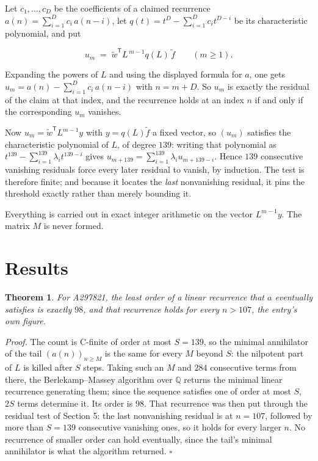 \documentclass[11pt]{article}
\newtheorem{theorem}{Theorem}
\theoremstyle{definition}
\begin{document}
Let $c_1,\dots,c_D$ be the coefficients of a claimed recurrence $a(n) = \sum_{i=1}^{D} c_i\,a(n-i)$, let $q(t) = t^{D} - \sum_{i=1}^{D} c_i t^{D-i}$ be its characteristic polynomial, and put

\[u_m \;=\; \tilde w^{\mathsf T} L^{\,m-1} q(L)\,\tilde f \qquad (m \ge 1).\]

Expanding the powers of $L$ and using the displayed formula for $a$, one gets $u_m = a(n) - \sum_{i=1}^{D} c_i\,a(n-i)$ with $n = m + D$. So $u_m$ is exactly the residual of the claim at that index, and the recurrence holds at an index $n$ if and only if the corresponding $u_m$ vanishes.

Now $u_m = \tilde w^{\mathsf T} L^{m-1} y$ with $y = q(L)\tilde f$ a fixed vector, so $(u_m)$ satisfies the characteristic polynomial of $L$, of degree $139$: writing that polynomial as $t^{139} - \sum_{i=1}^{139} \lambda_i t^{139-i}$ gives $u_{m+139} = \sum_{i=1}^{139} \lambda_i u_{m+139-i}$. Hence $139$ consecutive vanishing residuals force every later residual to vanish, by induction. The test is therefore finite; and because it locates the {\itshape last} nonvanishing residual, it pins the threshold exactly rather than merely bounding it.

Everything is carried out in exact integer arithmetic on the vector $L^{m-1}y$. The matrix $M$ is never formed.

\section{Results}

\begin{theorem} For A297821, the least order of a linear recurrence that $a$ eventually satisfies is exactly $98$, and that recurrence holds for every $n > 107$, the entry's own figure.\end{theorem}

{\itshape Proof.} The count is C-finite of order at most $S = 139$, so the minimal annihilator of the tail $(a(n))_{n \ge M}$ is the same for every $M$ beyond $S$: the nilpotent part of $L$ is killed after $S$ steps. Taking such an $M$ and $284$ consecutive terms from there, the Berlekamp--Massey algorithm over $\mathbb{Q}$ returns the minimal linear recurrence generating them; since the sequence satisfies one of order at most $S$, $2S$ terms determine it. Its order is $98$. That recurrence was then put through the residual test of Section 5: the last nonvanishing residual is at $n = 107$, followed by more than $S = 139$ consecutive vanishing ones, so it holds for every larger $n$. No recurrence of smaller order can hold eventually, since the tail's minimal annihilator is what the algorithm returned. $\square$
\end{document}
